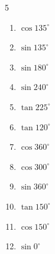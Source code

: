 \begin{multicols}{5}
\begin{enumerate}
        \phantom{$\displaystyle なし$}

  \item $\displaystyle \cos{135^\circ}$


  \item $\displaystyle \sin{135^\circ}$


  \item $\displaystyle \sin{180^\circ}$

        \phantom{$\displaystyle =0$}

  \item $\displaystyle \sin{240^\circ}$


  \item $\displaystyle \tan{225^\circ}$

        \phantom{$\displaystyle =1$}

  \item $\displaystyle \tan{120^\circ}$


  \item $\displaystyle \cos{360^\circ}$

        \phantom{$\displaystyle =1$}

\columnbreak %

  \item $\displaystyle \cos{300^\circ}$


  \item $\displaystyle \sin{360^\circ}$

        \phantom{$\displaystyle =0$}

  \item $\displaystyle \tan{150^\circ}$


  \item $\displaystyle \cos{150^\circ}$


  \item $\displaystyle \sin{0^\circ}$

        \phantom{$\displaystyle =0$}


\end{enumerate}
\end{multicols}
